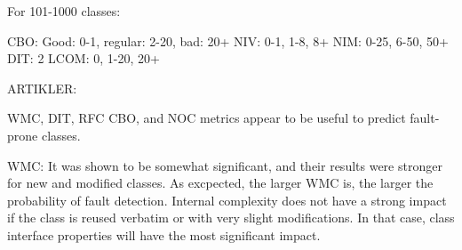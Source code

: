 \begin{table}[ht!]
\end{table}


For 101-1000 classes:

CBO: Good: 0-1, regular: 2-20, bad: 20+
NIV: 0-1, 1-8, 8+
NIM: 0-25, 6-50, 50+
DIT: 2
LCOM: 0, 1-20, 20+


ARTIKLER: 

WMC, DIT, RFC CBO, and NOC metrics appear to be useful to predict fault-prone classes. 

WMC: It was shown to be somewhat significant, and their results were stronger for new and modified classes. As excpected, the larger WMC is, the larger the probability of fault detection. Internal complexity does not have a strong impact if the class is reused verbatim or with very slight modifications. In that case, class interface properties will have the most significant impact.

